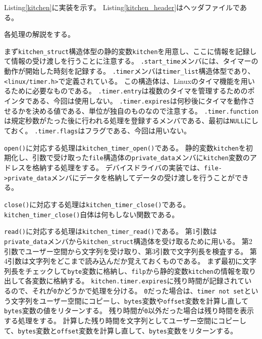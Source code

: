 \documentclass[main]{subfiles}
\begin{document}
Listing\ref{kitchen}に実装を示す。
Listing\ref{kitchen_header}はヘッダファイルである。




各処理の解説をする。

まず\texttt{kitchen\_struct}構造体型の静的変数\texttt{kitchen}を用意し、ここに情報を記録して情報の受け渡しを行うことに注意する。
\texttt{.start\_time}メンバには、タイマーの動作が開始した時刻を記録する。
\texttt{.timer}メンバは\texttt{timer\_list}構造体型であり、\texttt{<linux/timer.h>}で定義されている。
この構造体は、Linuxのタイマ機能を用いるために必要なものである。
\texttt{.timer.entry}は複数のタイマを管理するためのポインタである、今回は使用しない。
\texttt{.timer.expires}は何秒後にタイマを動作させるかを決める値である、単位が独自のものなので注意する。
\texttt{.timer.function}は規定秒数がたった後に行われる処理を登録するメンバである、最初は\texttt{NULL}にしておく。
\texttt{.timer.flags}はフラグである、今回は用いない。

\texttt{open()}に対応する処理は\texttt{kitchen\_timer\_open()}である。
静的変数\texttt{kitchen}を初期化し、引数で受け取った\texttt{file}構造体の\texttt{private\_data}メンバに\texttt{kitchen}変数のアドレスを格納する処理をする。
デバイスドライバの実装では、\texttt{file->private\_data}メンバにデータを格納してデータの受け渡しを行うことができる。

\texttt{close()}に対応する処理は\texttt{kitchen\_timer\_close()}である。
\texttt{kitchen\_timer\_close()}自体は何もしない関数である。

\texttt{read()}に対応する処理は\texttt{kitchen\_timer\_read()}である。
第1引数は\texttt{private\_data}メンバから\texttt{kitchen\_struct}構造体を受け取るために用いる。
第2引数でユーザー空間から文字列を受け取り、第3引数で文字列長を検査する。
第4引数は文字列をどこまで読み込んだか覚えておくものである。
まず最初に文字列長をチェックして\texttt{byte}変数に格納し、\texttt{filp}から静的変数\texttt{kitchen}の情報を取り出して各変数に格納する。
\texttt{kitchen.timer.expires}に残り時間が記録されているので、それが\texttt{0}かどうかで処理を分ける。
\texttt{0}だった場合は、\texttt{timer not set}という文字列をユーザー空間にコピーし、\texttt{bytes}変数や\texttt{offset}変数を計算し直して\texttt{bytes}変数の値をリターンする。
残り時間が\texttt{0}以外だった場合は残り時間を表示する処理をする。
計算した残り時間を文字列としてユーザー空間にコピーして、\texttt{bytes}変数と\texttt{offset}変数を計算し直して、\texttt{bytes}変数をリターンする。
\end{document}
